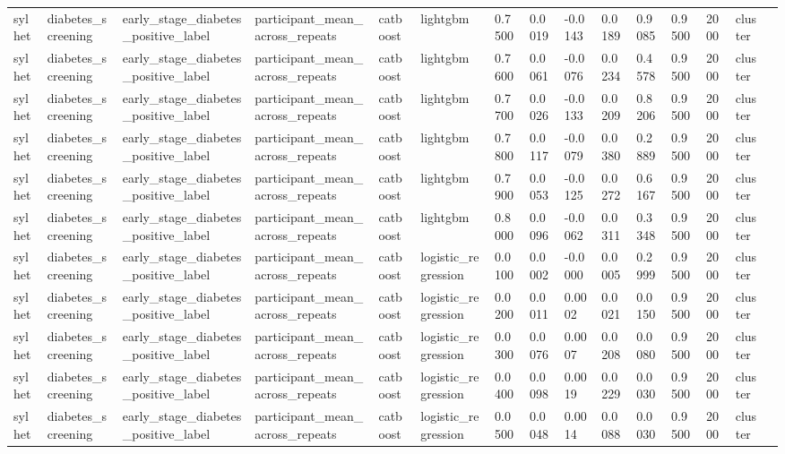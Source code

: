 \begin{tabular}{lllllllllllllll}
sylhet & diabetes\_screening & early\_stage\_diabetes\_positive\_label & participant\_mean\_across\_repeats & catboost & lightgbm & 0.7500 & 0.0019 & -0.0143 & 0.0189 & 0.9085 & 0.9500 & 2000 & cluster &  \\
sylhet & diabetes\_screening & early\_stage\_diabetes\_positive\_label & participant\_mean\_across\_repeats & catboost & lightgbm & 0.7600 & 0.0061 & -0.0076 & 0.0234 & 0.4578 & 0.9500 & 2000 & cluster &  \\
sylhet & diabetes\_screening & early\_stage\_diabetes\_positive\_label & participant\_mean\_across\_repeats & catboost & lightgbm & 0.7700 & 0.0026 & -0.0133 & 0.0209 & 0.8206 & 0.9500 & 2000 & cluster &  \\
sylhet & diabetes\_screening & early\_stage\_diabetes\_positive\_label & participant\_mean\_across\_repeats & catboost & lightgbm & 0.7800 & 0.0117 & -0.0079 & 0.0380 & 0.2889 & 0.9500 & 2000 & cluster &  \\
sylhet & diabetes\_screening & early\_stage\_diabetes\_positive\_label & participant\_mean\_across\_repeats & catboost & lightgbm & 0.7900 & 0.0053 & -0.0125 & 0.0272 & 0.6167 & 0.9500 & 2000 & cluster &  \\
sylhet & diabetes\_screening & early\_stage\_diabetes\_positive\_label & participant\_mean\_across\_repeats & catboost & lightgbm & 0.8000 & 0.0096 & -0.0062 & 0.0311 & 0.3348 & 0.9500 & 2000 & cluster &  \\
sylhet & diabetes\_screening & early\_stage\_diabetes\_positive\_label & participant\_mean\_across\_repeats & catboost & logistic\_regression & 0.0100 & 0.0002 & -0.0000 & 0.0005 & 0.2999 & 0.9500 & 2000 & cluster &  \\
sylhet & diabetes\_screening & early\_stage\_diabetes\_positive\_label & participant\_mean\_across\_repeats & catboost & logistic\_regression & 0.0200 & 0.0011 & 0.0002 & 0.0021 & 0.0150 & 0.9500 & 2000 & cluster &  \\
sylhet & diabetes\_screening & early\_stage\_diabetes\_positive\_label & participant\_mean\_across\_repeats & catboost & logistic\_regression & 0.0300 & 0.0076 & 0.0007 & 0.0208 & 0.0080 & 0.9500 & 2000 & cluster &  \\
sylhet & diabetes\_screening & early\_stage\_diabetes\_positive\_label & participant\_mean\_across\_repeats & catboost & logistic\_regression & 0.0400 & 0.0098 & 0.0019 & 0.0229 & 0.0030 & 0.9500 & 2000 & cluster &  \\
sylhet & diabetes\_screening & early\_stage\_diabetes\_positive\_label & participant\_mean\_across\_repeats & catboost & logistic\_regression & 0.0500 & 0.0048 & 0.0014 & 0.0088 & 0.0030 & 0.9500 & 2000 & cluster &  \\

\end{tabular}
